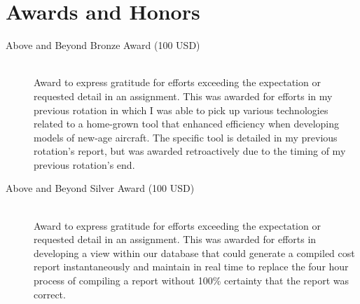 \documentclass{article}
\begin{document}
\section{Awards and Honors}
\begin{description}
  \item[Above and Beyond Bronze Award (100 USD)] \hfill \\
    Award to express gratitude for efforts exceeding the expectation or requested detail in an assignment. This was awarded for efforts in my previous rotation in which I was able to pick up various technologies related to a home-grown tool that enhanced efficiency when developing models of new-age aircraft. The specific tool is detailed in my previous rotation's report, but was awarded retroactively due to the timing of my previous rotation's end.
  \item[Above and Beyond Silver Award (100 USD)] \hfill \\
    Award to express gratitude for efforts exceeding the expectation or requested detail in an assignment. This was awarded for efforts in developing a view within our database that could generate a compiled cost report instantaneously and maintain in real time to replace the four hour process of compiling a report without 100\% certainty that the report was correct.
\end{description}
\end{document}
